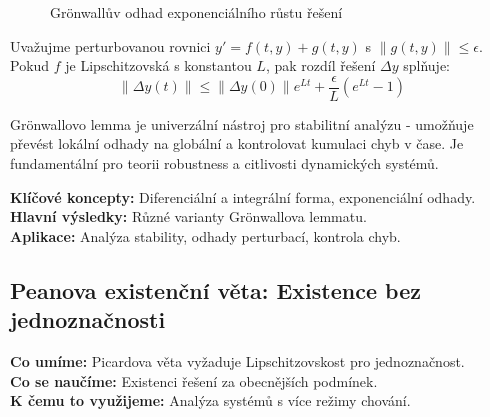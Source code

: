 \begin{figure}[h]
\centering
{}
\caption{Grönwallův odhad exponenciálního růstu řešení}
\label{fig:gronwall-estimate}
\end{figure}

\begin{example}
Uvažujme perturbovanou rovnici $y' = f(t,y) + g(t,y)$ s $\|g(t,y)\| \leq \epsilon$. Pokud $f$ je Lipschitzovská s konstantou $L$, pak rozdíl řešení $\Delta y$ splňuje:
\[
\|\Delta y(t)\| \leq \|\Delta y(0)\|e^{Lt} + \frac{\epsilon}{L}(e^{Lt} - 1)
\]
\end{example}

\begin{keyinsight}
Grönwallovo lemma je univerzální nástroj pro stabilitní analýzu - umožňuje převést lokální odhady na globální a kontrolovat kumulaci chyb v čase. Je fundamentální pro teorii robustness a citlivosti dynamických systémů.
\end{keyinsight}

\begin{summary}
\textbf{Klíčové koncepty:} Diferenciální a integrální forma, exponenciální odhady. \\
\textbf{Hlavní výsledky:} Různé varianty Grönwallova lemmatu. \\
\textbf{Aplikace:} Analýza stability, odhady perturbací, kontrola chyb.
\end{summary}

\spc

\subsection{Peanova existenční věta: Existence bez jednoznačnosti}

\begin{scaffold}
\textbf{Co umíme:} Picardova věta vyžaduje Lipschitzovskost pro jednoznačnost. \\
\textbf{Co se naučíme:} Existenci řešení za obecnějších podmínek. \\
\textbf{K čemu to využijeme:} Analýza systémů s více režimy chování.
\end{scaffold}

